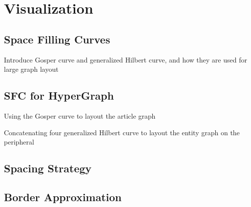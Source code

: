 \section{Visualization}
\subsection{Space Filling Curves}
Introduce Gosper curve and generalized Hilbert curve, and how they are used for large graph layout

\subsection{SFC for HyperGraph}
Using the Gosper curve to layout the article graph

Concatenating four generalized Hilbert curve to layout the entity graph on the peripheral
\subsection{Spacing Strategy}

\subsection{Border Approximation}

